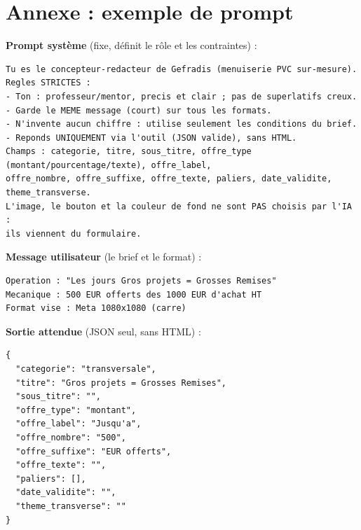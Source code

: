 \documentclass[11pt,a4paper]{article}
\begin{document}
\section{Annexe : exemple de prompt}
\label{sec:annexe-prompt}
\textbf{Prompt système} (fixe, définit le rôle et les contraintes) :

\begin{lstlisting}
Tu es le concepteur-redacteur de Gefradis (menuiserie PVC sur-mesure).
Regles STRICTES :
- Ton : professeur/mentor, precis et clair ; pas de superlatifs creux.
- Garde le MEME message (court) sur tous les formats.
- N'invente aucun chiffre : utilise seulement les conditions du brief.
- Reponds UNIQUEMENT via l'outil (JSON valide), sans HTML.
Champs : categorie, titre, sous_titre, offre_type (montant/pourcentage/texte), offre_label,
offre_nombre, offre_suffixe, offre_texte, paliers, date_validite, theme_transverse.
L'image, le bouton et la couleur de fond ne sont PAS choisis par l'IA :
ils viennent du formulaire.
\end{lstlisting}

\textbf{Message utilisateur} (le brief et le format) :

\begin{lstlisting}
Operation : "Les jours Gros projets = Grosses Remises"
Mecanique : 500 EUR offerts des 1000 EUR d'achat HT
Format vise : Meta 1080x1080 (carre)
\end{lstlisting}

\textbf{Sortie attendue} (JSON seul, sans HTML) :

\begin{lstlisting}
{
  "categorie": "transversale",
  "titre": "Gros projets = Grosses Remises",
  "sous_titre": "",
  "offre_type": "montant",
  "offre_label": "Jusqu'a",
  "offre_nombre": "500",
  "offre_suffixe": "EUR offerts",
  "offre_texte": "",
  "paliers": [],
  "date_validite": "",
  "theme_transverse": ""
}
\end{lstlisting}
\end{document}
